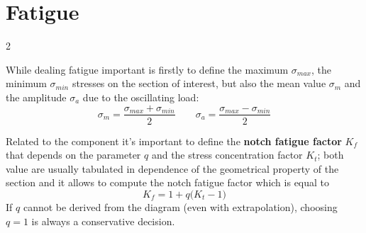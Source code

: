 \section{Fatigue}
\begin{multicols} 2
	
	While dealing fatigue important is firstly to define the maximum $\sigma_{max}$, the minimum $\sigma_{min}$ stresses on the section of interest, but also the mean value $\sigma_m$ and the amplitude $\sigma_a$ due to the oscillating load:
	\[ \sigma_m = \frac{\sigma_{max} + \sigma_{min}}{2} \qquad \sigma_a = \frac{\sigma_{max} - \sigma_{min}}{2} \]
	
	Related to the component it's important to define the \textbf{notch fatigue factor} $K_f$ that depends on the parameter $q$ and the stress concentration factor $K_t$; both value are usually tabulated in dependence of the geometrical property of the section and it allows to compute the notch fatigue factor which is equal to
	\begin{equation}
		K_f = 1 + q \big(K_t-1\big)
	\end{equation}
	If $q$ cannot be derived from the diagram (even with extrapolation), choosing $q=1$ is always a conservative decision. \vspace{3mm}
	

\end{multicols}
